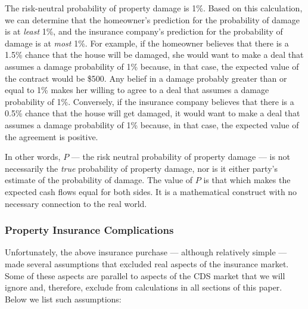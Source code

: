 \documentclass{jss}
\begin{document}


The risk-neutral probability of property damage is 1\%. Based on this calculation, we can determine that the homeowner's prediction for the probability of damage is at \emph{least} 1\%, and the insurance company's prediction for the probability of damage is at \emph{most} 1\%. For example, if the homeowner believes that there is a 1.5\% chance that the house will be damaged, she would want to make a deal that assumes a damage probability of 1\% because, in that case, the expected value of the contract would be \$500. Any belief in a damage probably greater than or equal to 1\% makes her willing to agree to a deal that assumes a damage probability of 1\%. Conversely, if the insurance company believes that there is a 0.5\% chance that the house will get damaged, it would want to make a deal that assumes a damage probability of 1\% because, in that case, the expected value of the agreement is positive. 

In other words, $P$ --- the risk neutral probability of property damage --- is not necessarily the \emph{true} probability of property damage, nor is it either party's estimate of the  probability of damage. The value of $P$ is that which makes the expected cash flows equal for both sides. It is a mathematical construct with no necessary connection to the real world.

\subsubsection{Property Insurance Complications}

Unfortunately, the above insurance purchase --- although relatively simple --- made several assumptions that excluded real aspects of the insurance market. Some of these aspects are parallel to aspects of the CDS market that we will ignore and, therefore, exclude from calculations in all sections of this paper. Below we list such assumptions:
\end{document}
